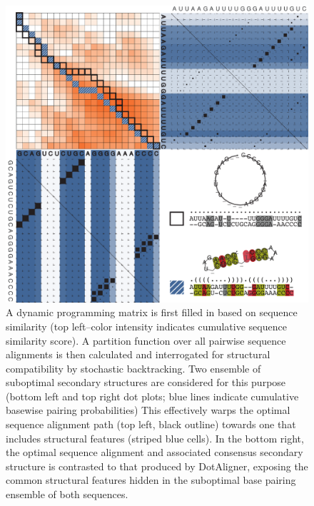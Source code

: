 \documentclass{bmcart}
\begin{document}
\begin{backmatter}
\begin{figure}[h!]
\includegraphics[width=\textwidth]{fig1}
 \caption {
  A dynamic  programming matrix is first filled in based on sequence 
  similarity (top left--color intensity indicates cumulative sequence similarity score). 
  A partition function over all pairwise sequence alignments is then calculated and 
  interrogated for structural compatibility by stochastic backtracking. 
  Two ensemble of suboptimal secondary structures are considered for this purpose
  (bottom left and top right dot plots; blue lines indicate cumulative basewise pairing probabilities)      This effectively warps the optimal  sequence alignment path (top left, black outline) towards one that includes structural features (striped blue cells).  In the bottom right, the optimal sequence alignment 
  and associated consensus secondary structure is contrasted to that produced 
  by DotAligner, exposing the common structural features hidden in the suboptimal 
  base pairing ensemble of both sequences. 
 }
\end{figure}



\end{backmatter}
\end{document}
